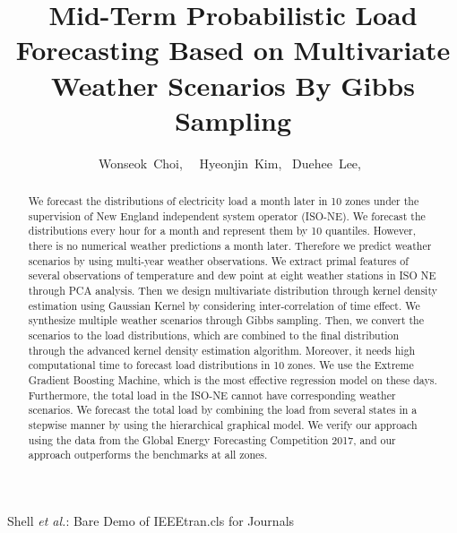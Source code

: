 \documentclass[journal]{IEEEtran} %
\begin{document}
\title{Mid-Term Probabilistic Load Forecasting Based on Multivariate Weather Scenarios By Gibbs Sampling}

\author{Wonseok~Choi,~ ~Hyeonjin~Kim,~
	Duehee~Lee,~
	}





%
{Shell \MakeLowercase{\textit{et al.}}: Bare Demo of IEEEtran.cls for Journals}
\maketitle




\begin{abstract}
We forecast the distributions of electricity load a month later in 10 zones under the supervision of New England independent system operator (ISO-NE). We forecast the distributions every hour for a month and represent them by 10 quantiles.
However, there is no numerical weather predictions a month later. Therefore we predict weather scenarios by using multi-year weather observations. We extract primal features of several observations of temperature and dew point at eight weather stations in ISO NE through PCA analysis. Then we design multivariate distribution through kernel density estimation using Gaussian Kernel by considering inter-correlation of time effect. We synthesize multiple weather scenarios through Gibbs sampling. Then, we convert the scenarios to the load distributions, which are combined to the final distribution through the advanced kernel density estimation algorithm.
Moreover, it needs high computational time to forecast load distributions in 10 zones. We use the Extreme Gradient Boosting Machine, which is the most effective regression model on these days.
Furthermore, the total load in the ISO-NE cannot have corresponding weather scenarios. We forecast the total load by combining the load from several states in a stepwise manner by using the hierarchical graphical model. 
%
We verify our approach using the data from the Global Energy Forecasting Competition 2017, and our approach outperforms the benchmarks at all zones.
\end{abstract}
\end{document}
